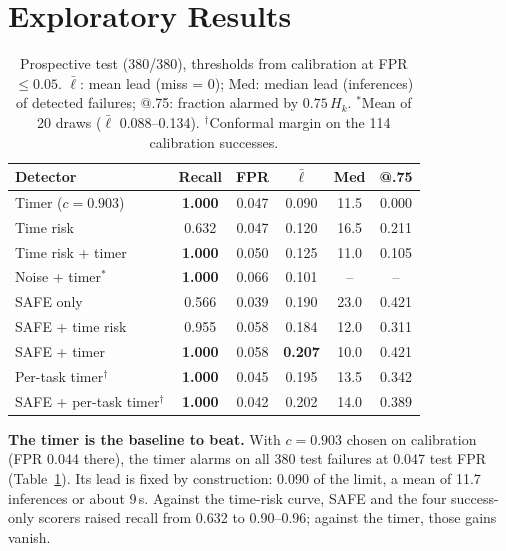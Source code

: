 \documentclass[10pt,a4paper,twocolumn]{article}
\begin{document}
\def\qualdir{../rss2027_stage1/figures/qualitative}


\section{Exploratory Results}
\label{sec:results}

\begin{table}[t]
\centering
\caption{Prospective test (380/380), thresholds from calibration at FPR $\le 0.05$.
$\bar\ell$: mean lead (miss = 0); Med: median lead (inferences) of detected failures; @.75:
fraction alarmed by $0.75\,H_k$. $^\ast$Mean of 20 draws ($\bar\ell$ 0.088--0.134).
$^\dagger$Conformal margin on the 114 calibration successes.}
\label{tab:main}
\footnotesize
\setlength{\tabcolsep}{3.5pt}
\begin{tabular}{@{}lccccc@{}}
\toprule
Detector & Recall & FPR & $\bar\ell$ & Med & @.75 \\
\midrule
Timer ($c = 0.903$) & \textbf{1.000} & 0.047 & 0.090 & 11.5 & 0.000 \\
Time risk & 0.632 & 0.047 & 0.120 & 16.5 & 0.211 \\
Time risk + timer & \textbf{1.000} & 0.050 & 0.125 & 11.0 & 0.105 \\
Noise + timer$^\ast$ & \textbf{1.000} & 0.066 & 0.101 & -- & -- \\
\midrule
SAFE only & 0.566 & 0.039 & 0.190 & 23.0 & 0.421 \\
SAFE + time risk & 0.955 & 0.058 & 0.184 & 12.0 & 0.311 \\
SAFE + timer & \textbf{1.000} & 0.058 & \textbf{0.207} & 10.0 & 0.421 \\
\midrule
Per-task timer$^\dagger$ & \textbf{1.000} & 0.045 & 0.195 & 13.5 & 0.342 \\
SAFE + per-task timer$^\dagger$ & \textbf{1.000} & 0.042 & 0.202 & 14.0 & 0.389 \\
\bottomrule
\end{tabular}
\end{table}

\textbf{The timer is the baseline to beat.} With $c = 0.903$ chosen on calibration
(FPR 0.044 there), the timer alarms on all 380 test failures at 0.047 test FPR
(Table~\ref{tab:main}). Its lead is fixed by construction: 0.090 of the limit, a mean of
11.7 inferences or about 9\,s. Against the time-risk curve, SAFE and the four success-only
scorers raised recall from 0.632 to 0.90--0.96; against the timer, those gains vanish.
\end{document}
